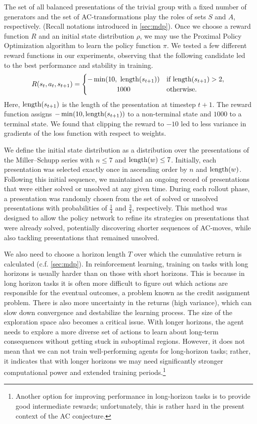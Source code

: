 The set of all balanced presentations of the trivial group with a fixed number of generators and the set of AC-transformations play the roles of sets $S$ and $A$, respectively. (Recall notations introduced in \autoref{sec:mdp}). Once we choose a reward function $R$ and an initial state distribution $\rho$, we may use the Proximal Policy Optimization algorithm to learn the policy function $\pi$. We tested a few different reward functions in our experiments, observing that the following candidate led to the best performance and stability in training.
\[
R(s_{t}, a_{t}, s_{t+1}) =
\begin{cases}
	-\min(10, \ \length(s_{t+1})) & \text{if length}(s_{t+1}) > 2, \\
	\hfil 1000 & \text{otherwise.}
\end{cases}
\]
Here, $\operatorname{length}(s_{t+1})$ is the length of the presentation at timestep $t+1$. The reward function assigns $-\min(10, \operatorname{length}(s_{t+1}))$ to a non-terminal state and $1000$ to a terminal state. We found that clipping the reward to $-10$ led to less variance in gradients of the loss function with respect to weights.

We define the initial state distribution as a distribution over the presentations of the Miller--Schupp series with $n \leq 7$ and $\operatorname{length}(w) \leq 7$. Initially, each presentation was selected exactly once in ascending order by $n$ and $\operatorname{length}(w)$. Following this initial sequence, we maintained an ongoing record of presentations that were either solved or unsolved at any given time. During each rollout phase, a presentation was randomly chosen from the set of solved or unsolved presentations with probabilities of $\frac{1}{4}$ and $\frac{3}{4}$, respectively. This method was designed to allow the policy network to refine its strategies on presentations that were already solved, potentially discovering shorter sequences of AC-moves, while also tackling presentations that remained unsolved.

We also need to choose a horizon length $T$ over which the cumulative return is calculated (c.f. \autoref{sec:mdp}). In reinforcement learning, training on tasks with long horizons is usually harder than on those with short horizons. This is because in long horizon tasks it is often more difficult to figure out which actions are responsible for the eventual outcomes, a problem known as the credit assignment problem. There is also more uncertainty in the returns (high variance), which can slow down convergence and destabilize the learning process. The size of the exploration space also becomes a critical issue. With longer horizons, the agent needs to explore a more diverse set of actions to learn about long-term consequences without getting stuck in suboptimal regions. However, it does not mean that we can not train well-performing agents for long-horizon tasks; rather, it indicates that with longer horizons we may need significantly stronger computational power and extended training periods.\footnote{Another option for improving performance in long-horizon tasks is to provide good intermediate rewards; unfortunately, this is rather hard in the present context of the AC conjecture.}

